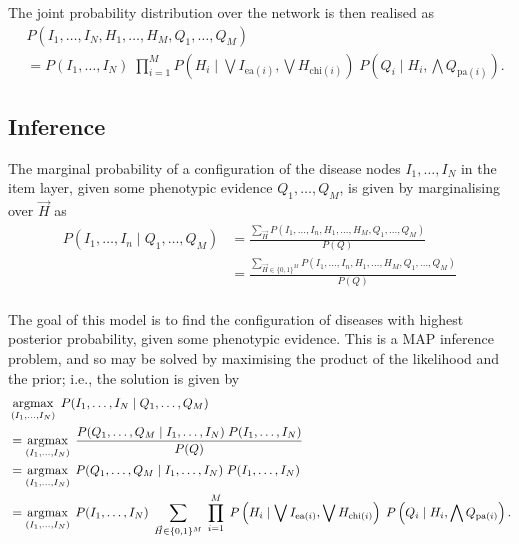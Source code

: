 The joint probability distribution over the network is then realised as
%
\begin{align}
    &P(I_1, \hdots, I_N, H_1, \hdots, H_M, Q_1, \hdots, Q_M) \nonumber\\
    &=  P(I_1, \hdots, I_N) 
    \; \prod_{i=1}^M P\left(H_i \mid \bigvee I_{\text{ea}(i)}, \bigvee H_{\text{chi}(i)}\right)
    \; P\left(Q_i \mid H_i, \bigwedge Q_{\text{pa}(i)}\right). \label{eq:joint}
\end{align}

\subsection{Inference}

The marginal probability of a configuration of the disease nodes $I_1, \hdots,
I_N$ in the item layer, given some phenotypic evidence $Q_1, \hdots, Q_M$, is
given by marginalising over $\vec{H}$ as
%
\begin{align*}
    P(I_1, \hdots, I_n \mid Q_1, \hdots, Q_M)
    &= \frac{\sum_{\vec{H}} P(I_1, \hdots, I_n, H_1, \hdots, H_M, Q_1, \hdots, Q_M)}{P(Q)} \\
    &= \frac{\sum_{\vec{H} \in \{0, 1\}^M} P(I_1, \hdots, I_n, H_1, \hdots, H_M, Q_1, \hdots, Q_M)}{P(Q)} \\
\end{align*}

The goal of this model is to find the configuration of diseases with highest
posterior probability, given some phenotypic evidence.
%
This is a MAP inference problem, and so may be solved by maximising the product
of the likelihood and the prior; i.e., the solution is given by
%
\begin{align}
    &\argmax_{(I_1, \hdots, I_N)} \;
    P(I_1, \hdots, I_N \mid Q_1, \hdots, Q_M) \nonumber\\
    &= \argmax_{(I_1, \hdots, I_N)} \;
    \frac{P(Q_1, \hdots, Q_M \mid I_1, \hdots, I_N )\; P(I_1, \hdots, I_N)}{P(Q)} \nonumber\\
    &= \argmax_{(I_1, \hdots, I_N)} \;
    P(Q_1, \hdots, Q_M \mid I_1, \hdots, I_N )\; P(I_1, \hdots, I_N) \nonumber\\
    &= \argmax_{(I_1, \hdots, I_N)} \;
    P(I_1, \hdots, I_N)
    \;\sum_{\vec{H} \in \{0, 1\}^M} \; \prod_{i=1}^M \; P\left(H_i \mid \bigvee I_{\text{ea}(i)}, \bigvee H_{\text{chi}(i)}\right)
    \; P\left(Q_i \mid H_i, \bigwedge Q_{\text{pa}(i)}\right).\label{eq:mapinf}
\end{align}

